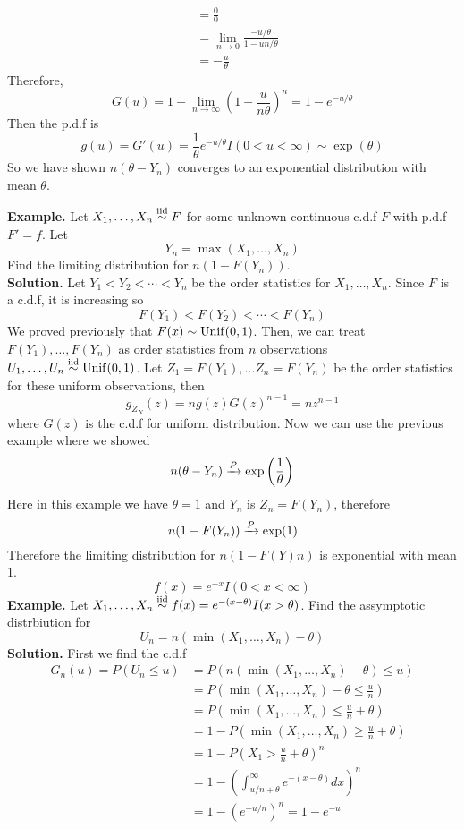 \begin{enumerate}[label=(\roman*)]
\begin{align*}
        &= \frac{0}{0}\tag{Apply L'hoptial's Rule}\\
        &= \lim_{n\rightarrow 0}\frac{-u/\theta}{1 - un/\theta}\\
        &= -\frac{u}{\theta}
    \end{align*}
    Therefore, 
    \[G(u) = 1 -\lim_{n\rightarrow\infty} \left(1 - \frac{u}{n\theta}\right)^n = 1 - e^{-u/\theta}\]
    Then the p.d.f is 
    \[g(u) = G'(u) = \frac{1}{\theta}e^{-u/\theta}I(0 < u < \infty) \sim \exp\left(\theta\right) \]
    So we have shown $n(\theta-Y_n)$ converges to an exponential distribution with mean $\theta$.
\end{enumerate}
\textbf{Example.} Let $X_1, \ldots, X_n \overset{\mathrm{iid}}{\sim} F$ for some unknown continuous c.d.f $F$ with p.d.f $F' = f$. Let 
\[Y_n = \max(X_1,\ldots,X_n)\]
Find the limiting distribution for $n(1 - F(Y_n))$.\\[2ex]
\textbf{Solution.} Let $Y_1 < Y_2 < \cdots < Y_n$ be the order statistics for $X_1, \ldots, X_n$. Since $F$ is a c.d.f, it is increasing so 
\[F(Y_1) < F(Y_2) < \cdots < F(Y_n)\]
We proved previously that $F(x) \sim \operatorname{Unif}(0,1)$. Then, we can treat $F(Y_1), \ldots, F(Y_n)$ as order statistics from $n$ observations $U_1, \ldots, U_n \overset{\mathrm{iid}}{\sim} \operatorname{Unif}(0,1)$. Let $Z_1 = F(Y_1), \ldots Z_n = F(Y_n)$ be the order statistics for these uniform observations, then 
\[g_{Z_N}(z) = ng(z)G(z)^{n-1} = nz^{n-1}\]
where $G(z)$ is the c.d.f for uniform distribution. Now we can use the previous example where we showed
\[n(\theta-Y_n)\xrightarrow{P} \exp\left(\frac{1}{\theta}\right)\]
Here in this example we have $\theta = 1$ and $Y_n$ is $Z_n = F(Y_n)$, therefore 
\[n(1 - F(Y_n)) \xrightarrow{P} \exp(1)\]
Therefore the limiting distribution for $n(1-F(Y)n)$ is exponential with mean 1.
\[f(x) = e^{-x}I(0 < x < \infty)\]
\textbf{Example.} Let $X_1, \ldots, X_n \overset{\mathrm{iid}}{\sim} f(x) = e^{-(x-\theta)}I(x > \theta)$. Find the assymptotic distrbiution for 
\[U_n = n(\min(X_1,\ldots, X_n) - \theta)\]
\textbf{Solution.} First we find the c.d.f 
\begin{align*}
    G_n(u) = P(U_n \leq u) &= P(n(\min(X_1,\ldots, X_n) - \theta) \leq u)\\
    &= P\left(\min(X_1, \ldots, X_n) - \theta \leq \frac{u}{n}\right)\\
    &= P\left(\min(X_1, \ldots, X_n) \leq \frac{u}{n} + \theta\right)\\
    &= 1 - P\left(\min(X_1,\ldots, X_n) \geq \frac{u}{n} + \theta\right)\\
    &= 1 - P\left(X_1 > \frac{u}{n} + \theta\right)^n\\
    &= 1 - \left(\int_{u/n + \theta}^\infty e^{-(x-\theta)}dx\right)^n\\
    &= 1 - \left(e^{-u/n}\right)^n = 1-e^{-u}
\end{align*}
